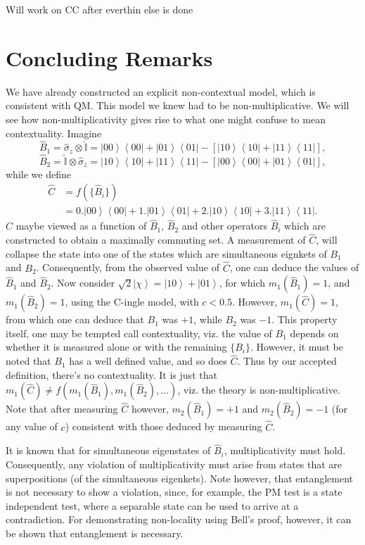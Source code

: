 \documentclass[british,aps,prl,superscriptaddress,nofootinbib,times,reprint]{revtex4-1}
\theoremstyle{plain}
\theoremstyle{definition}
\theoremstyle{remark}
\theoremstyle{plain}
\theoremstyle{plain}
\theoremstyle{plain}
\theoremstyle{definition}
\theoremstyle{definition}
\begin{document}
{\color{red} Will work on CC after everthin else
is done}
\section{Concluding Remarks
\label{sec:implications}} We have already
constructed an explicit non-contextual model,
which is consistent with QM.  This model we knew
had to be non-multiplicative.  We will see how
non-multiplicativity gives rise to what one might
confuse to mean contextuality.  Imagine \[
\hat{B}_{1}=\hat{\sigma}_{z}\otimes\hat{\mathbb{I}}=\left|00\right\rangle
\left\langle 00\right|+\left|01\right\rangle
\left\langle 01\right|-\left[\left|10\right\rangle
\left\langle 10\right|+\left|11\right\rangle
\left\langle 11\right|\right], \] \[
\hat{B}_{2}=\hat{\mathbb{I}}\otimes\hat{\sigma}_{z}=\left|10\right\rangle
\left\langle 10\right|+\left|11\right\rangle
\left\langle 11\right|-\left[\left|00\right\rangle
\left\langle 00\right|+\left|01\right\rangle
\left\langle 01\right|\right], \] while we define
\begin{align*} \hat{C}&=f(\{\hat{B}_{i}\}) \\
&=0.\left|00\right\rangle \left\langle
00\right|+1.\left|01\right\rangle \left\langle
01\right|+2.\left|10\right\rangle \left\langle
10\right|+3.\left|11\right\rangle \left\langle
11\right|.  \end{align*} $\hat{C}$ maybe viewed as
a function of $\hat{B}_{1}$, $\hat{B}_{2}$ and
other operators $\hat{B}_{i}$ which are
constructed to obtain a maximally commuting set. A
measurement of $\hat{C}$, will collapse the state
into one of the states which are simultaneous
eignkets of $B_{1}$ and $B_{2}$. Consequently,
from the observed value of $\hat{C}$, one can
deduce the values of $\hat{B}_{1}$ and
$\hat{B}_{2}$. Now consider
$\sqrt{2}\left|\chi\right\rangle
=\left|10\right\rangle +\left|01\right\rangle $,
for which $m_{1}(\hat{B}_{1})=1$, and
$m_{1}(\hat{B}_{2})=1$, using the C-ingle model,
with $c<0.5$. However, $m_{1}(\hat{C})=1$, from
which one can deduce that $B_{1}$ was $+1$, while
$B_{2}$ was $-1$.  This property itself, one may
be tempted call contextuality, viz.  the value of
$B_{1}$ depends on whether it is measured alone or
with the remaining $\{B_{i}\}$. However, it must
be noted that $B_{1}$ has a well defined value,
and so does $\hat{C}$. Thus by our accepted
definition, there's no contextuality. It is just
that $m_{1}(\hat{C})\neq
f(m_{1}(\hat{B}_{1}),m_{1}(\hat{B}_{2}),\dots)$,
viz. the theory is non-multiplicative. Note that
after measuring $\hat{C}$ however,
$m_{2}(\hat{B}_{1})=+1$ and
$m_{2}(\hat{B}_{2})=-1$ (for any value of $c$)
consistent with those deduced by measuring
$\hat{C}$.


It is known that for simultaneous eigenstates of
$\hat{B}_{i}$, multiplicativity must hold.
Consequently, any violation of multiplicativity
must arise from states that are superpositions (of
the simultaneous eigenkets).  Note however, that
entanglement is not necessary to show a violation,
since, for example, the PM test is a state
independent test, where a separable state can be
used to arrive at a contradiction. For
demonstrating non-locality using Bell's proof,
however, it can be shown that entanglement is
necessary.  

\end{document}

